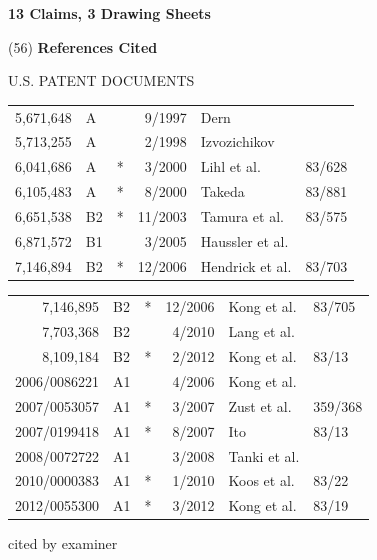 \documentclass{article}
\begin{document}
\begin{center}\textbf{13 Claims, 3 Drawing Sheets}\end{center}

\noindent (56) \hfill \textbf{References Cited} \hfill\mbox{}

\begin{center}U.S. PATENT DOCUMENTS\end{center}
\noindent
\begin{tabular}{@{}rlcrll@{}}
5,671,648 & A &  & 9/1997 & Dern & \\
5,713,255 & A &  & 2/1998 & Izvozichikov & \\
6,041,686 & A & * & 3/2000 & Lihl et al. & 83/628\\
6,105,483 & A & * & 8/2000 & Takeda & 83/881\\
6,651,538 & B2 & * & 11/2003 & Tamura et al. & 83/575\\
6,871,572 & B1 &  & 3/2005 & Haussler et al. & \\
7,146,894 & B2 & * & 12/2006 & Hendrick et al. & 83/703\\
\end{tabular}
\noindent
\begin{tabular}{@{}rlcrll@{}}
7,146,895 & B2 & * & 12/2006 & Kong et al. & 83/705\\
7,703,368 & B2 &  & 4/2010 & Lang et al. & \\
8,109,184 & B2 & * & 2/2012 & Kong et al. & 83/13\\
2006/0086221 & A1 &  & 4/2006 & Kong et al. & \\
2007/0053057 & A1 & * & 3/2007 & Zust et al. & 359/368\\
2007/0199418 & A1 & * & 8/2007 & Ito & 83/13\\
2008/0072722 & A1 &  & 3/2008 & Tanki et al. & \\
2010/0000383 & A1 & * & 1/2010 & Koos et al. & 83/22\\
2012/0055300 & A1 & * & 3/2012 & Kong et al. & 83/19\\
\end{tabular}

\noindent * cited by examiner
\end{document}
